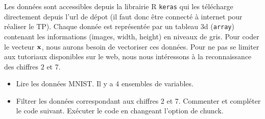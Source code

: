 \documentclass[]{article}
\newenvironment{Shaded}{\begin{snugshade}}{\end{snugshade}}
\newcommand{\KeywordTok}[1]{\textcolor[rgb]{0.13,0.29,0.53}{\textbf{#1}}}
\newcommand{\DecValTok}[1]{\textcolor[rgb]{0.00,0.00,0.81}{#1}}
\newcommand{\StringTok}[1]{\textcolor[rgb]{0.31,0.60,0.02}{#1}}
\newcommand{\CommentTok}[1]{\textcolor[rgb]{0.56,0.35,0.01}{\textit{#1}}}
\newcommand{\OperatorTok}[1]{\textcolor[rgb]{0.81,0.36,0.00}{\textbf{#1}}}
\newcommand{\NormalTok}[1]{#1}
\providecommand{\tightlist}{%
  \setlength{\itemsep}{0pt}\setlength{\parskip}{0pt}}
\begin{document}
Les données sont accessibles depuis la librairie R \texttt{keras} qui
les télécharge directement depuis l'url de dépot (il faut donc être
connecté à internet pour réaliser le TP). Chaque donnée est représentée
par un tableau 3d (\texttt{array}) contenant les informations (images,
width, height) en niveaux de gris. Pour coder le vecteur \({\bf x}\),
nous aurons besoin de vectoriser ces données. Pour ne pas se limiter aux
tutoriaux disponibles sur le web, nous nous intéressons à la
reconnaissance des chiffres \(2\) et 7.

\begin{itemize}
\tightlist
\item
  Lire les données MNIST. Il y a 4 ensembles de variables.
\end{itemize}

\begin{Shaded}
\end{Shaded}

\begin{itemize}
\tightlist
\item
  Filtrer les données correspondant aux chiffres \(2\) et 7. Commenter
  et compléter le code suivant. Exécuter le code en changeant l'option
  de chunck.
\end{itemize}

\begin{Shaded}
\end{Shaded}
\end{document}
